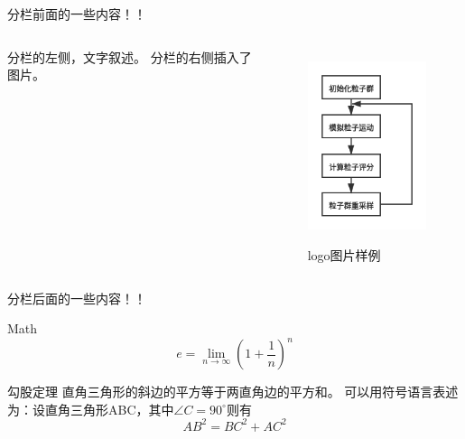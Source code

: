 \begin{frame}
  分栏前面的一些内容！！
  \begin{columns}%
  分栏的左侧，文字叙述。
  分栏的右侧插入了图片。
   \begin{figure}[!h]
    \centering
    \includegraphics[width=4cm]{pics/mcl}\\
    \caption{logo图片样例}\label{pic6}
  \end{figure}
  \end{columns}
  分栏后面的一些内容！！
  \end{frame}

  \begin{frame}{Math} %
    \begin{equation*}
      e = \lim_{n\to \infty} \left(1 + \frac{1}{n}\right)^n
    \end{equation*}
  \end{frame}

  \begin{frame}
    \begin{block}{勾股定理}
    直角三角形的斜边的平方等于两直角边的平方和。
    可以用符号语言表述为：设直角三角形ABC，其中$\angle C=90^\circ$则有
    \begin{equation}
    AB^2=BC^2+AC^2
    \end{equation}
    \end{block}
    \end{frame}


